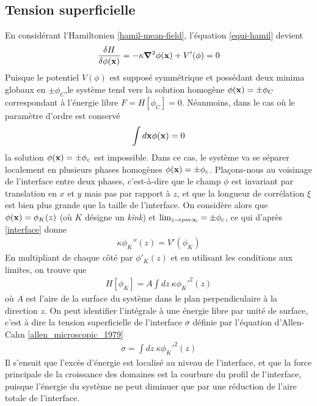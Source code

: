     \subsection{Tension superficielle}
En considérant l'Hamiltonien \ref{hamil-mean-field}, l'équation \ref{equi-hamil} devient
\begin{align}
    \frac{\delta H}{\delta \phi({\bf x})} = -\kappa {\boldsymbol \nabla}^2 \phi({\bf x}) + V'(\phi) = 0
    \label{interface}
\end{align}
Puisque le potentiel $V(\phi)$ est supposé symmétrique et possédant deux minima globaux en $\pm \phi_C$,le système tend vers la solution homogène $\phi({\bf x}) = \pm \phi_C$ correspondant à l'énergie libre $F=H[\phi_C]=0$. Néanmoins, dans le cas où le paramètre d'ordre est conservé
\begin{align}
    \int d {\bf x} \phi({\bf x})=0
\end{align}
la solution $\phi({\bf x})=\pm \phi_c$ est impossible. Dans ce cas, le système va se séparer localement en plusieurs phases homogènes $\phi({\bf x})= \pm \phi_c$. 
Plaçons-nous au voisinage de l'interface entre deux phases, c'est-à-dire que le champ $\phi$ est invariant par translation en $x$ et $y$ mais pas par rapport à $z$, et que la longueur de corrélation $\xi$ est bien plus grande que la taille de l'interface. On considère alors que $\phi({\bf x}) = \phi_K(z)$ (où $K$ désigne un \textit{kink}) et $\lim_{z\to\\pm\infty}=\pm \phi_c$, ce qui d'après \ref{interface} donne
\begin{align}
    \kappa \phi_K''(z) =  V'(\phi_K)
    \label{kink}
\end{align}
En multipliant de chaque côté par $\phi'_K(z)$ et en utilisant les conditions aux limites, on trouve que 
\begin{align}
    H[\phi_K]=  A\int dz\ \kappa \phi_K'^2(z)
\end{align}
où $A$ est l'aire de la surface du système dans le plan perpendiculaire à la direction $z$. On peut identifier l'intégrale à une énergie libre par unité de surface, c'est à dire la tension superficielle de l'interface $\sigma$ définie par l'équation d'Allen-Cahn \ref{allen_microscopic_1979}
\begin{align}
    \sigma=  \int dz\ \kappa \phi_K'^2(z)
    \label{tension-superficielle}
\end{align}
Il s'ensuit que l'excès d'énergie est localisé au niveau de l'interface, et que la force principale de la croissance des domaines est la courbure du profil de l'interface, puisque l'énergie du système ne peut diminuer que par une réduction de l'aire totale de l'interface. 

